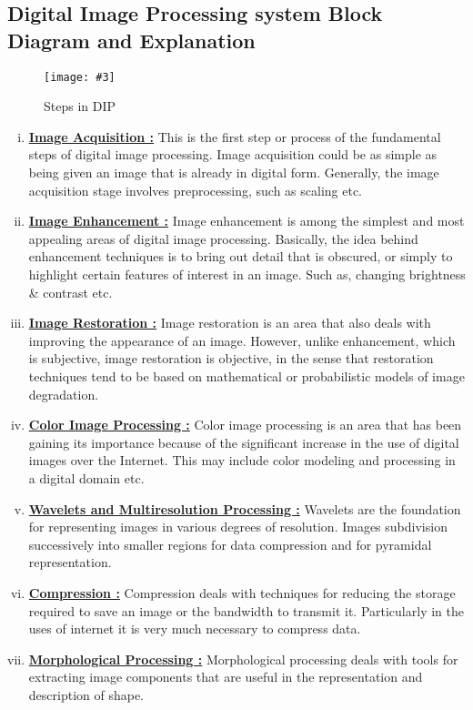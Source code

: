 \documentclass{article}
\newcommand{\addImage}[5]{
    \begin{figure}[#1]
        \centering
        \texttt{[image: \#3]}
        \caption{#4}
        \label{fig:#5}
    \end{figure}
}
\begin{document}
\begin{multicols}{2}
        \section{Digital Image Processing system Block Diagram and Explanation}
        \addImage{H}{10cm}{DIPSteps.jpg}{Steps in DIP}{steps in DIP}
        \begin{enumerate}[(i)]
            \item \textbf{\underline{Image Acquisition :}} This is the first step or process of the fundamental steps of digital image processing. Image acquisition could be as simple as being given an image that is already in digital form. Generally, the image acquisition stage involves preprocessing, such as scaling etc.
            \item \textbf{\underline{Image Enhancement :}} Image enhancement is among the simplest and most appealing areas of digital image processing. Basically, the idea behind enhancement techniques is to bring out detail that is obscured, or simply to highlight certain features of interest in an image. Such as, changing brightness & contrast etc.
            \item \textbf{\underline{Image Restoration :}} Image restoration is an area that also deals with improving the appearance of an image. However, unlike enhancement, which is subjective, image restoration is objective, in the sense that restoration techniques tend to be based on mathematical or probabilistic models of image degradation.
            \item \textbf{\underline{Color Image Processing :}} Color image processing is an area that has been gaining its importance because of the significant increase in the use of digital images over the Internet. This may include color modeling and processing in a digital domain etc.
            \item \textbf{\underline{Wavelets and Multiresolution Processing :}} Wavelets are the foundation for representing images in various degrees of resolution. Images subdivision successively into smaller regions for data compression and for pyramidal representation.
            \item \textbf{\underline{Compression :}} Compression deals with techniques for reducing the storage required to save an image or the bandwidth to transmit it. Particularly in the uses of internet it is very much necessary to compress data.
            \item \textbf{\underline{Morphological Processing :}} Morphological processing deals with tools for extracting image components that are useful in the representation and description of shape.

\end{enumerate}
\end{multicols}
\end{document}
